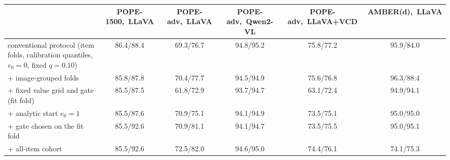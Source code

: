 \begin{tabular}{lccccc}
\toprule
 & POPE-1500,\ LLaVA & POPE-adv,\ LLaVA & POPE-adv,\ Qwen2-VL & POPE-adv,\ LLaVA+VCD & AMBER(d),\ LLaVA\\
\midrule
conventional protocol (item folds, calibration quantiles, $e_0{=}0$, fixed $q{=}0.10$) & 86.4/88.4 & 69.3/76.7 & 94.8/95.2 & 75.8/77.2 & 95.9/84.0\\
+ image-grouped folds & 85.8/87.8 & 70.4/77.7 & 94.5/94.9 & 75.6/76.8 & 96.3/88.4\\
+ fixed value grid and gate (fit fold) & 85.5/87.5 & 61.8/72.9 & 93.7/94.7 & 63.1/72.4 & 94.9/94.1\\
+ analytic start $e_0{=}1$ & 85.5/87.6 & 70.9/75.1 & 94.1/94.9 & 73.5/75.1 & 95.0/95.0\\
+ gate chosen on the fit fold & 85.5/92.6 & 70.9/81.1 & 94.1/94.7 & 73.5/75.5 & 95.0/95.1\\
+ all-item cohort & 85.5/92.6 & 72.5/82.0 & 94.6/95.0 & 74.4/76.1 & 74.1/75.3\\
\bottomrule
\end{tabular}
